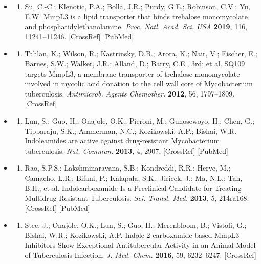 \documentclass{article}
\begin{document}
\begin{itemize}
\begin{enumerate}
\end{enumerate}

\item \begin{enumerate}
\item 
Su, C.-C.; Klenotic, P.A.; Bolla, J.R.; Purdy, G.E.; Robinson, C.V.; Yu, E.W. MmpL3 is a lipid transporter that binds trehalose monomycolate and phosphatidylethanolamine. \textit{Proc. Natl. Acad. Sci. USA} \textbf{2019}, 116, 11241–11246. [CrossRef] [PubMed]

\end{enumerate}

\item \begin{enumerate}
\item 
Tahlan, K.; Wilson, R.; Kastrinsky, D.B.; Arora, K.; Nair, V.; Fischer, E.; Barnes, S.W.; Walker, J.R.; Alland, D.; Barry, C.E., 3rd; et al. SQ109 targets MmpL3, a membrane transporter of trehalose monomycolate involved in mycolic acid donation to the cell wall core of Mycobacterium tuberculosis. \textit{Antimicrob. Agents Chemother.} \textbf{2012}, 56, 1797–1809. [CrossRef]

\end{enumerate}

\item \begin{enumerate}
\item 
Lun, S.; Guo, H.; Onajole, O.K.; Pieroni, M.; Gunosewoyo, H.; Chen, G.; Tipparaju, S.K.; Ammerman, N.C.; Kozikowski, A.P.; Bishai, W.R. Indoleamides are active against drug-resistant Mycobacterium tuberculosis. \textit{Nat. Commun.} \textbf{2013}, 4, 2907. [CrossRef] [PubMed]

\end{enumerate}

\item \begin{enumerate}
\item 
Rao, S.P.S.; Lakshminarayana, S.B.; Kondreddi, R.R.; Herve, M.; Camacho, L.R.; Bifani, P.; Kalapala, S.K.; Jiricek, J.; Ma, N.L.; Tan, B.H.; et al. Indolcarboxamide Is a Preclinical Candidate for Treating Multidrug-Resistant Tuberculosis. \textit{Sci. Transl. Med.} \textbf{2013}, 5, 214ra168. [CrossRef] [PubMed]

\end{enumerate}

\item \begin{enumerate}
\item 
Stec, J.; Onajole, O.K.; Lun, S.; Guo, H.; Merenbloom, B.; Vistoli, G.; Bishai, W.R.; Kozikowski, A.P. Indole-2-carboxamide-based MmpL3 Inhibitors Show Exceptional Antitubercular Activity in an Animal Model of Tuberculosis Infection. \textit{J. Med. Chem.} \textbf{2016}, 59, 6232–6247. [CrossRef]


\end{enumerate}
\end{itemize}
\end{document}
